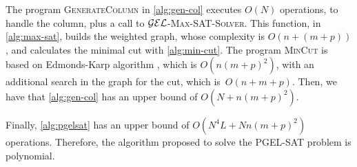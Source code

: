 The program \textsc{GenerateColumn} in \autoref{alg:gen-col} executes $O(N)$ operations, to handle the column, plus a call to $\mathcal{GEL}$-\textsc{Max-SAT-Solver}. This function, in \autoref{alg:max-sat}, builds the weighted graph, whose complexity is $O(n + (m + p))$, and calculates the minimal cut with \autoref{alg:min-cut}. The program \textsc{MinCut} is based on Edmonds-Karp algorithm \citep{cormen2009introduction}, which is $O(n (m + p)^2)$, with an additional search in the graph for the cut, which is~$O(n + m + p)$. Then, we have that \autoref{alg:gen-col} has an upper bound of $O(N + n(m + p)^2)$. 

Finally, \autoref{alg:pgelsat} has an upper bound of $O(N^4L + Nn(m+p)^2)$ operations. Therefore, the algorithm proposed to solve the PGEL-SAT problem is polynomial.
